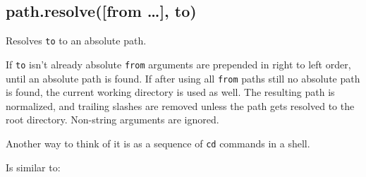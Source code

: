 \begin{Shaded}
\begin{Highlighting}[]
\NormalTok{(}\NormalTok{, }\NormalTok{, }\NormalTok{, }\NormalTok{, }\NormalTok{)}

\NormalTok{(}\NormalTok{, \{\}, }\NormalTok{)}
 
\end{Highlighting}
\end{Shaded}

\subsection{path.resolve({[}from \ldots{}{]}, to)}

Resolves \texttt{to} to an absolute path.

If \texttt{to} isn't already absolute \texttt{from} arguments are
prepended in right to left order, until an absolute path is found. If
after using all \texttt{from} paths still no absolute path is found, the
current working directory is used as well. The resulting path is
normalized, and trailing slashes are removed unless the path gets
resolved to the root directory. Non-string arguments are ignored.

Another way to think of it is as a sequence of \texttt{cd} commands in a
shell.

\begin{Shaded}
\begin{Highlighting}[]
\NormalTok{(}\NormalTok{, }\NormalTok{, }\NormalTok{, }\NormalTok{)}
\end{Highlighting}
\end{Shaded}

Is similar to:

\begin{Shaded}
\begin{Highlighting}[]
 
\end{Highlighting}
\end{Shaded}

